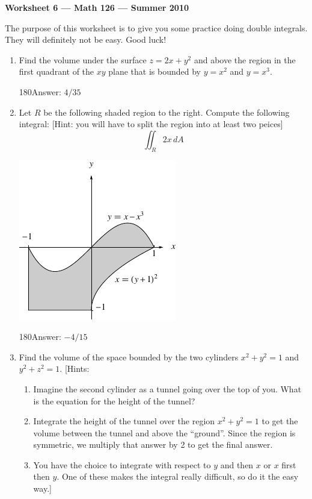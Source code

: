\documentclass[oneside,11pt]{article}
\begin{document}
\begin{center}
{\bf Worksheet 6 --- Math 126 --- Summer 2010}
\end{center}

The purpose of this worksheet is to give you some practice doing double integrals. They will definitely not be easy. Good luck!
\begin{enumerate}
\item Find the volume under the surface $z=2x+y^2$ and above the region in the first quadrant of the $xy$ plane that is bounded by $y=x^2$ and $y=x^3$.

\vfill 
\hfill \begin{turn}{180}{\footnotesize Answer: $4/35$}\end{turn}

\newpage
\item
\begin{minipage}[t]{4.5in}
Let $R$ be the following shaded region to the right. Compute the following integral: [Hint: you will have to split the region into at least two peices]
$$\iint_R 2x \, dA$$
\end{minipage}
\begin{minipage}[t]{2in}\vspace{-10pt}\includegraphics{ws6-region.pdf}\end{minipage}

\vfill
\hfill \begin{turn}{180}{\footnotesize Answer: $-4/15$}\end{turn}
\newpage
\item Find the volume of the space bounded by the two cylinders $x^2+y^2=1$ and $y^2+z^2=1$. [Hints:\\

\vspace{-22pt}
{\begin{enumerate}\footnotesize
\item Imagine the second cylinder as a tunnel going over the top of you. What is the equation for the height of the tunnel?
\item Integrate the height of the tunnel over the region $x^2+y^2=1$ to get the volume between the tunnel and above the ``ground''. Since the region is symmetric, we multiply that answer by 2 to get the final answer.
\item You have the choice to integrate with respect to $y$ and then $x$ or $x$ first then $y$. One of these makes the integral really difficult, so do it the easy way.]
\end{enumerate}}


\end{enumerate}
\end{document}
